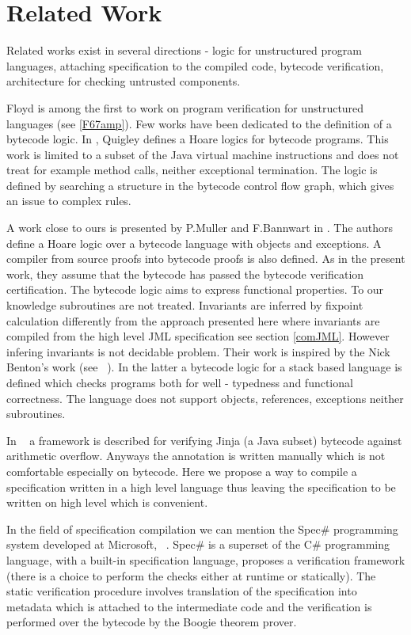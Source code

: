 \section{Related Work} \label{relWork}
    
Related works exist in several directions -  logic for unstructured program languages,  attaching specification to the compiled code, bytecode verification, architecture for
checking untrusted components.

Floyd is among the first to work on program verification for unstructured languages (see \ref{F67amp}).
Few works have been dedicated to the definition of a bytecode logic. In \cite{Quigley}, Quigley defines a Hoare logics for bytecode programs. 
 This work is limited to a subset of the Java virtual machine instructions and does not treat for example method calls, 
 neither exceptional termination. The logic is defined by searching a structure in the bytecode control flow graph, 
 which gives an issue to complex rules.

A work close to ours is presented by P.Muller and F.Bannwart in \cite{BM05plb}. The authors define a Hoare logic over a 
bytecode language with objects and  exceptions. A compiler from source proofs into bytecode proofs is also defined. 
As in the present work, they assume that the bytecode has passed the bytecode verification certification. The bytecode logic aims to 
express functional properties. To our knowledge subroutines are not treated. Invariants are inferred by fixpoint calculation differently 
from the approach presented here where invariants are compiled from the high level JML specification see section \ref{comJML}. 
However infering invariants is not decidable problem. Their work is inspired by the Nick Benton's work (see ~\cite{B04tlsj}). 
In the latter a bytecode logic for a stack based language is defined which checks programs both for well - typedness and functional correctness. 
 The language does not support objects, references, exceptions neither subroutines. 

In ~\cite{WildmoserN-ESOP05} a  framework is described for verifying Jinja (a Java subset) bytecode against arithmetic overflow. 
Anyways the annotation is written manually which is not comfortable especially on bytecode. 
Here we propose a way to compile a specification written in a high level language thus leaving the specification to be written on 
high level which is convenient.

In the field of specification compilation we can mention the Spec\# programming system developed at Microsoft,
~\cite{BLS04sp}. Spec\#  is a superset of the C\# programming language, with a built-in  specification language,
 proposes a verification framework (there is a choice to perform the checks either at runtime or statically). 
 The static verification procedure  involves translation of the specification into metadata which is attached to the intermediate code 
 and the verification is performed over the bytecode by the Boogie theorem prover.

